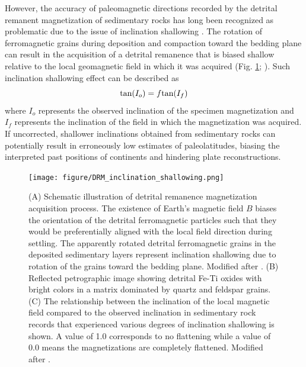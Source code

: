 However, the accuracy of paleomagnetic directions recorded by the detrital remanent magnetization of sedimentary rocks has long been recognized as problematic due to the issue of inclination shallowing \citep[e.g.][]{King1955a, Kodama2012a, Tauxe1984a, Van-Andel1966a}. The rotation of ferromagnetic grains during deposition and compaction toward the bedding plane can result in the acquisition of a detrital remanence that is biased shallow relative to the local geomagnetic field in which it was acquired (Fig. \ref{fig:DRM_inclination_shallowing}; \citealp{Tauxe2005a}). Such inclination shallowing effect can be described as 
\begin{equation*}
\textup{tan}(I_o) = f\textup{tan}(I_f)
\end{equation*}
where $I_o$ represents the observed inclination of the specimen magnetization and $I_f$ represents the inclination of the field in which the magnetization was acquired. If uncorrected, shallower inclinations obtained from sedimentary rocks can potentially result in erroneously low estimates of paleolatitudes, biasing the interpreted past positions of continents and hindering plate reconstructions.

\begin{figure}[h]
    \centering
    \texttt{[image: figure/DRM\_inclination\_shallowing.png]}
    \caption[The inclination shallowing problem in detrital remanent magnetization]{(A) Schematic illustration of detrital remanence magnetization acquisition process. The existence of Earth's magnetic field $B$ biases the orientation of the detrital ferromagnetic particles such that they would be preferentially aligned with the local field direction during settling. The apparently rotated detrital ferromagnetic grains in the deposited sedimentary layers represent inclination shallowing due to rotation of the grains toward the bedding plane. Modified after \cite{Tauxe1993a}. (B) Reflected petrographic image showing detrital Fe-Ti oxides with bright colors in a matrix dominated by quartz and feldspar grains. (C) The relationship between the inclination of the local magnetic field compared to the observed inclination in sedimentary rock records that experienced various degrees of inclination shallowing is shown. A value of 1.0 corresponds to no flattening while a value of 0.0 means the magnetizations are completely flattened. Modified after \cite{Pierce2022a}.}
    \label{fig:DRM_inclination_shallowing}
\end{figure}

